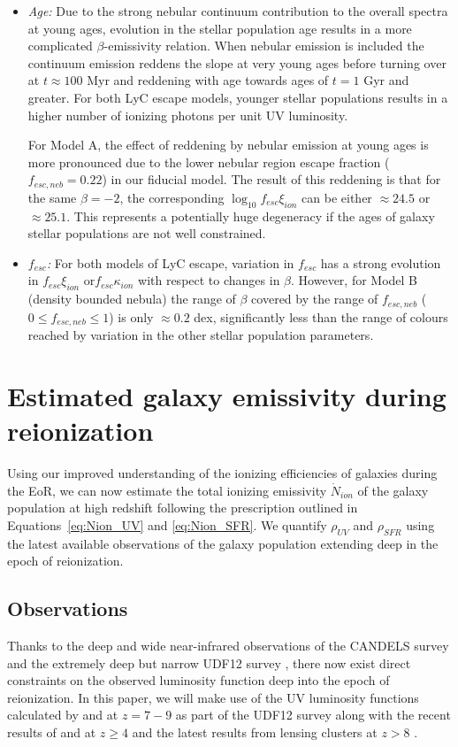 \begin{itemize}
    \item \emph{Age:} Due to the strong nebular continuum contribution to the overall spectra at young ages, evolution in the stellar population age results in a more complicated $\beta$-emissivity relation. When nebular emission is included the continuum emission reddens the slope at very young ages before turning over at $t\approx100$ Myr and reddening with age towards ages of $t = 1$ Gyr and greater. For both LyC escape models, younger stellar populations results in a higher number of ionizing photons per unit UV luminosity. 

    For Model A, the effect of reddening by nebular emission at young ages is more pronounced due to the lower nebular region escape fraction ($f_{esc,neb} = 0.22$) in our fiducial model. The result of this reddening is that for the same $\beta = -2$, the corresponding $\log_{10} f_{esc}\xi_{ion}$ can be either $\approx 24.5$ or $\approx 25.1$. This represents a potentially huge degeneracy if the ages of galaxy stellar populations are not well constrained.
    
    \item \emph{$f_{esc}$:} For both models of LyC escape, variation in $f_{esc}$ has a strong evolution in $f_{esc}\xi_{ion}$ or$f_{esc}\kappa_{ion}$ with respect to changes in $\beta$. However, for Model B (density bounded nebula) the range of $\beta$ covered by the range of $f_{esc,neb}$ ($0 \leq f_{esc,neb} \leq 1$) is only $\approx 0.2$ dex, significantly less than the range of colours reached by variation in the other stellar population parameters.
\end{itemize}


\section{Estimated galaxy emissivity during reionization}\label{sec:results}
Using our improved understanding of the ionizing efficiencies of galaxies during the EoR, we can now estimate the total ionizing emissivity $\dot{N}_{ion}$ of the galaxy population at high redshift following the prescription outlined in Equations~\ref{eq:Nion_UV} and \ref{eq:Nion_SFR}. We quantify $\rho_{UV}$ and $\rho_{SFR}$ using the latest available observations of the galaxy population extending deep in the epoch of reionization.

\subsection{Observations}\label{sec:observations}
Thanks to the deep and wide near-infrared observations of the CANDELS survey \citep{2011ApJS..197...35G,Koekemoer:2011br} and the extremely deep but narrow UDF12 survey \citep{Koekemoer:2013db}, there now exist direct constraints on the observed luminosity function deep into the epoch of reionization. In this paper, we will make use of the UV luminosity functions calculated by \citet{McLure:2013hh} and \citet{Schenker:2013cl} at $z = 7 - 9$ as part of the UDF12 survey along with the recent results of \citet{Bouwens:2014tx} and \citep{Finkelstein:2014ub} at $z \geq 4$ and the latest results from lensing clusters at $z >8$ \citep{Oesch:2014cs,McLeod:2014wz}.

